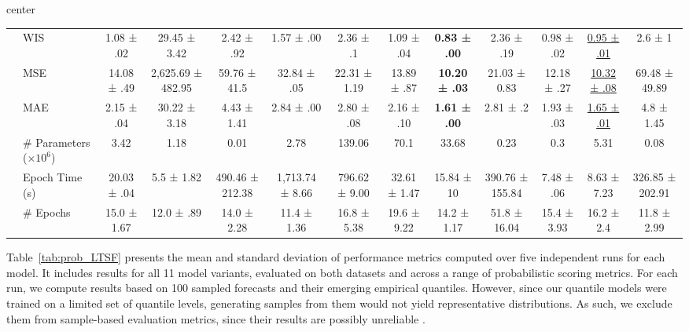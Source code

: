 \documentclass[a4paper,oneside,bibliography=totoc]{scrbook}
\begin{document}
\begin{sidewaystable}[htbp]
\begin{adjustbox}{center}
{\begin{tabular}{ll*{11}{c}}
& WIS    & 1.08 ± .02 & 29.45 ± 3.42 & 2.42 ± .92 & 1.57 ± .00 & 2.36 ± .1 & 1.09 ± .04 & \textbf{0.83 ± .00} & 2.36 ± .19 & 0.98 ± .02 & \underline{0.95 ± .01} & 2.6 ± 1 \\
& MSE    & 14.08 ± .49 & 2,625.69 ± 482.95 & 59.76 ± 41.5 & 32.84 ± .05 & 22.31 ± 1.19 & 13.89 ± .87 &  \textbf{10.20 ± .03} & 21.03 ± 0.83 & 12.18 ± .27  & \underline{10.32 ± .08} & 69.48 ± 49.89 \\
& MAE    & 2.15 ± .04 & 30.22 ± 3.18 & 4.43 ± 1.41 & 2.84 ± .00 & 2.80 ± .08 & 2.16 ± .10 & \textbf{1.61 ± .00} & 2.81 ± .2 &  1.93 ± .03 & \underline{1.65 ± .01} & 4.8 ± 1.45 \\
& \# Parameters ($\times 10^{6}$)    
& 3.42 & 1.18 & 0.01 
& 2.78 & 139.06 
& 70.1 & 33.68 & 0.23 
& 0.3 & 5.31 & 0.08 \\

& Epoch Time (s)    
& 20.03 ± .04 & 5.5 ± 1.82 & 490.46 ± 212.38
& 1,713.74 ± 8.66 & 796.62 ± 9.00 
& 32.61 ± 1.47 & 15.84 ± 10 & 390.76 ± 155.84
& 7.48 ± .06 & 8.63 ± 7.23 & 326.85 ± 202.91\\

& \# Epochs    
& 15.0 ± 1.67 & 12.0 ± .89 & 14.0 ± 2.28
& 11.4 ± 1.36  & 16.8 ± 5.38
& 19.6 ± 9.22 & 14.2 ± 1.17 & 51.8 ± 16.04
& 15.4 ± 3.93  & 16.2 ± 2.4 & 11.8 ± 2.99\\
\bottomrule
\end{tabular}
}
\end{adjustbox}
\label{tab:prob_LTSF}
\end{sidewaystable}

Table~\ref{tab:prob_LTSF} presents the mean and standard deviation of performance metrics computed over five independent runs for each model. It includes results for all 11 model variants, evaluated on both datasets and across a range of probabilistic scoring metrics.
For each run, we compute results based on 100 sampled forecasts and their emerging empirical quantiles.
However, since our quantile models were trained on a limited set of quantile levels, generating samples from them would not yield representative distributions. 
As such, we exclude them from sample-based evaluation metrics, since their results are possibly unreliable \cite{marcotte_regions_2023, bracher_evaluating_2021}.
\end{document}
